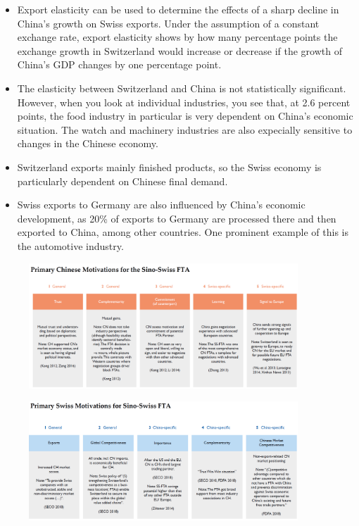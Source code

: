 \begin{itemize}
    \item Export elasticity can be used to determine the effects of a sharp
        decline in China's growth on Swiss exports. Under the assumption of
        a constant exchange rate, export elasticity shows by how many
        percentage points the exchange growth in Switzerland would increase
        or decrease if the growth of China's GDP changes by one percentage
        point.
    \item The elasticity between Switzerland and China is not statistically
        significant. However, when you look at individual industries, you
        see that, at 2.6 percent points, the food industry in particular
        is very dependent on China's economic situation. The watch and
        machinery industries are also expecially sensitive to changes in
        the Chinese economy.
    \item Switzerland exports mainly finished products, so the Swiss economy
        is particularly dependent on Chinese final demand.
    \item Swiss exports to Germany are also influenced by China's economic
        development, as 20\% of exports to Germany are processed there and then
        exported to China, among other countries. One prominent example
        of this is the automotive industry.
\end{itemize}

\begin{figure}[H]
    \centering
    \includegraphics[width=0.9\textwidth]{Pictures/chinese_motivation.png}
\end{figure}

\begin{figure}[H]
    \centering
    \includegraphics[width=0.9\textwidth]{Pictures/swiss_motivations.png}
\end{figure}


